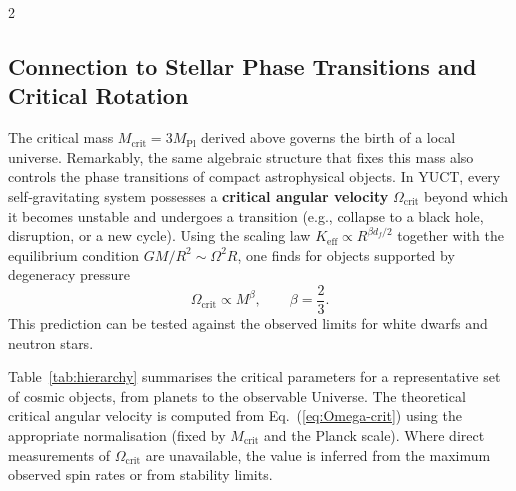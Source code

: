 \documentclass[12pt,a4paper]{article}
\newcommand{\Keff}{K_{\mathrm{eff}}}
\begin{document}
\begin{multicols}{2}
		\subsection{Connection to Stellar Phase Transitions and Critical Rotation}
		
		The critical mass \(M_{\mathrm{crit}} = 3M_{\mathrm{Pl}}\) derived above governs the birth of a local universe. Remarkably, the same algebraic structure that fixes this mass also controls the phase transitions of compact astrophysical objects. In YUCT, every self‑gravitating system possesses a \textbf{critical angular velocity} \(\Omega_{\mathrm{crit}}\) beyond which it becomes unstable and undergoes a transition (e.g., collapse to a black hole, disruption, or a new cycle). Using the scaling law \(\Keff \propto R^{\beta d_f/2}\) together with the equilibrium condition \(GM/R^2 \sim \Omega^2 R\), one finds for objects supported by degeneracy pressure
		\begin{equation}
			\Omega_{\mathrm{crit}} \propto M^{\beta}, \qquad \beta = \frac{2}{3}.
			\label{eq:Omega-crit}
		\end{equation}
		This prediction can be tested against the observed limits for white dwarfs and neutron stars.
		
		Table~\ref{tab:hierarchy} summarises the critical parameters for a representative set of cosmic objects, from planets to the observable Universe. The theoretical critical angular velocity is computed from Eq.~(\ref{eq:Omega-crit}) using the appropriate normalisation (fixed by \(M_{\mathrm{crit}}\) and the Planck scale). Where direct measurements of \(\Omega_{\mathrm{crit}}\) are unavailable, the value is inferred from the maximum observed spin rates or from stability limits.
		
	\end{multicols}
	
\end{document}
